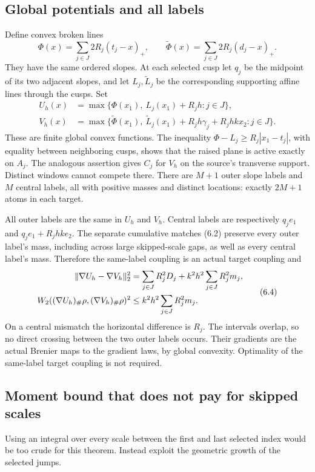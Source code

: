 \subsection{Global potentials and all labels}
Define convex broken lines
\[
 \Phi(x)=\sum_{j\in J}2R_j(t_j-x)_+,\qquad
 \widetilde\Phi(x)=\sum_{j\in J}2R_j(d_j-x)_+.
\]
They have the same ordered slopes. At each selected cusp let $q_j$ be the midpoint of its two adjacent slopes, and let $L_j,\widetilde L_j$ be the corresponding supporting affine lines through the cusps. Set
\begin{align*}
 U_h(x)&=\max\{\Phi(x_1),\ L_j(x_1)+R_jh:j\in J\},\\
 V_h(x)&=\max\{\widetilde\Phi(x_1),\
 \widetilde L_j(x_1)+R_jh\gamma_j+R_jhkx_2:j\in J\}.
\end{align*}
These are finite global convex functions. The inequality $\Phi-L_j\ge R_j|x_1-t_j|$, with equality between neighboring cusps, shows that the raised plane is active exactly on $A_j$. The analogous assertion gives $C_j$ for $V_h$ on the source's transverse support. Distinct windows cannot compete there. There are $M+1$ outer slope labels and $M$ central labels, all with positive masses and distinct locations: exactly $2M+1$ atoms in each target.

All outer labels are the same in $U_h$ and $V_h$. Central labels are respectively $q_je_1$ and $q_je_1+R_jhke_2$. The separate cumulative matches (6.2) preserve every outer label's mass, including across large skipped-scale gaps, as well as every central label's mass. Therefore the same-label coupling is an actual target coupling and
\begin{equation}
 \begin{aligned}
 \lVert\nabla U_h-\nabla V_h\rVert_2^2
 &=\sum_{j\in J}R_j^2D_j+k^2h^2\sum_{j\in J}R_j^2m_j,\\
 W_2((\nabla U_h)_\#\rho,(\nabla V_h)_\#\rho)^2
 &\le k^2h^2\sum_{j\in J}R_j^2m_j.
 \end{aligned}\tag{6.4}
\end{equation}
On a central mismatch the horizontal difference is $R_j$. The intervals overlap, so no direct crossing between the two outer labels occurs. Their gradients are the actual Brenier maps to the gradient laws, by global convexity. Optimality of the same-label target coupling is not required.

\subsection{Moment bound that does not pay for skipped scales}
Using an integral over every scale between the first and last selected index would be too crude for this theorem. Instead exploit the geometric growth of the selected jumps.

